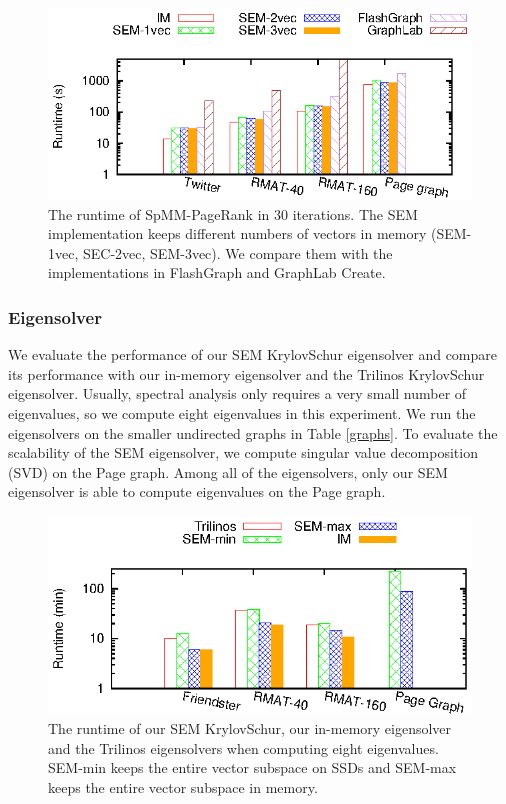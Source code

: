 \begin{figure}
	\begin{center}
		\footnotesize
		\includegraphics[scale=1]{SpMM_figs/pagerank.eps}
		\caption{The runtime of SpMM-PageRank in 30 iterations. The SEM
			implementation keeps different numbers of vectors in memory
			(SEM-1vec, SEC-2vec, SEM-3vec). We compare them with
		the implementations in FlashGraph and GraphLab Create.}
		\label{perf:pagerank}
	\end{center}
\end{figure}

\subsubsection{Eigensolver}

We evaluate the performance of our SEM KrylovSchur eigensolver and compare
its performance
with our in-memory eigensolver and the Trilinos KrylovSchur eigensolver.
Usually, spectral analysis only requires a very small number of
eigenvalues, so we compute eight eigenvalues in this experiment. We run
the eigensolvers on the smaller undirected graphs
in Table \ref{graphs}. To evaluate the scalability of the SEM eigensolver,
we compute singular value decomposition (SVD) on the Page graph. Among all of
the eigensolvers, only our SEM eigensolver is able to compute eigenvalues
on the Page graph.

\begin{figure}
	\begin{center}
		\footnotesize
		\includegraphics[scale=1]{SpMM_figs/eigen-runtime-8ev.eps}
		\caption{The runtime of our SEM KrylovSchur, our in-memory eigensolver
			and the Trilinos eigensolvers when computing eight
			eigenvalues. SEM-min keeps the entire vector subspace on SSDs and
		SEM-max keeps the entire vector subspace in memory.}
		\label{fig:eigen}
	\end{center}
\end{figure}

